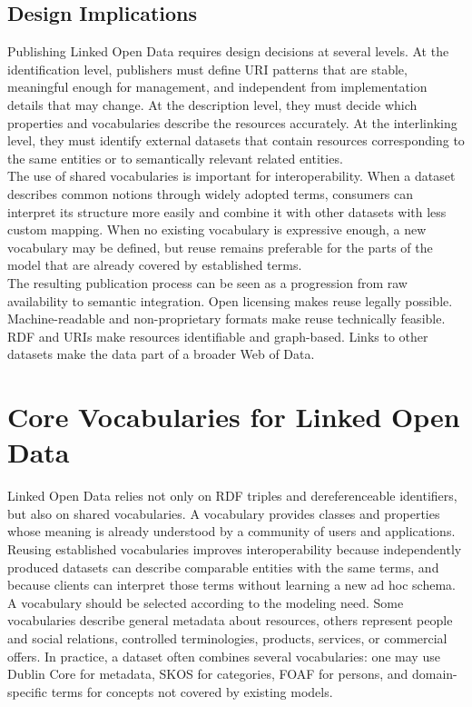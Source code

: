 \documentclass{scrbook}
\begin{document}
	\section{Design Implications}
	
	Publishing Linked Open Data requires design decisions at several levels. At the identification level, publishers must define URI patterns that are stable, meaningful enough for management, and independent from implementation details that may change. At the description level, they must decide which properties and vocabularies describe the resources accurately. At the interlinking level, they must identify external datasets that contain resources corresponding to the same entities or to semantically relevant related entities.\\
	
	The use of shared vocabularies is important for interoperability. When a dataset describes common notions through widely adopted terms, consumers can interpret its structure more easily and combine it with other datasets with less custom mapping. When no existing vocabulary is expressive enough, a new vocabulary may be defined, but reuse remains preferable for the parts of the model that are already covered by established terms.\\
	
	The resulting publication process can be seen as a progression from raw availability to semantic integration. Open licensing makes reuse legally possible. Machine-readable and non-proprietary formats make reuse technically feasible. RDF and URIs make resources identifiable and graph-based. Links to other datasets make the data part of a broader Web of Data.
	
	\chapter{Core Vocabularies for Linked Open Data}
	
	Linked Open Data relies not only on RDF triples and dereferenceable identifiers, but also on shared vocabularies. A vocabulary provides classes and properties whose meaning is already understood by a community of users and applications. Reusing established vocabularies improves interoperability because independently produced datasets can describe comparable entities with the same terms, and because clients can interpret those terms without learning a new ad hoc schema.\\
	
	A vocabulary should be selected according to the modeling need. Some vocabularies describe general metadata about resources, others represent people and social relations, controlled terminologies, products, services, or commercial offers. In practice, a dataset often combines several vocabularies: one may use Dublin Core for metadata, SKOS for categories, FOAF for persons, and domain-specific terms for concepts not covered by existing models.
	
\end{document}

